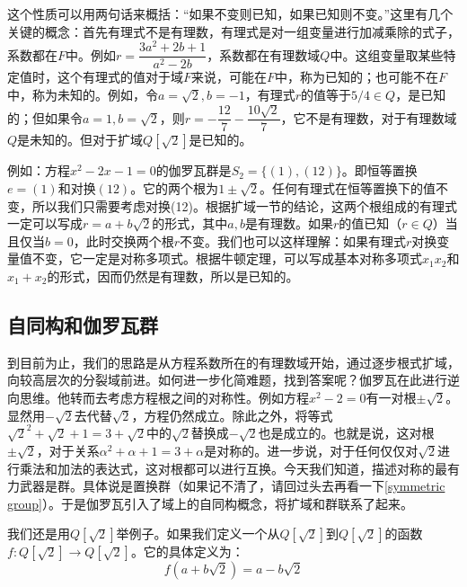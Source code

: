 \documentclass[b5paper]{ctexart}
\begin{document}
这个性质可以用两句话来概括：“如果不变则已知，如果已知则不变。”这里有几个关键的概念：首先有理式不是有理数，有理式是对一组变量进行加减乘除的式子，系数都在$F$中。例如$r = \dfrac{3a^2 + 2b + 1}{a^2 - 2b}$，系数都在有理数域$Q$中。这组变量取某些特定值时，这个有理式的值对于域$F$来说，可能在$F$中，称为已知的；也可能不在$F$中，称为未知的。例如，令$a = \sqrt{2}, b = -1$，有理式$r$的值等于$5/4 \in Q$，是已知的；但如果令$a = 1, b = \sqrt{2}$，则$r = -\dfrac{12}{7} - \dfrac{10\sqrt{2}}{7}$，它不是有理数，对于有理数域$Q$是未知的。但对于扩域$Q[\sqrt{2}]$是已知的。

例如：方程$x^2 - 2x - 1 = 0$的伽罗瓦群是$S_2 = \{(1), (12)\}$。即恒等置换$e = (1)$和对换$(12)$。它的两个根为$1 \pm \sqrt{2}$。任何有理式在恒等置换下的值不变，所以我们只需要考虑对换(12)。根据扩域一节的结论，这两个根组成的有理式一定可以写成$r = a + b\sqrt{2}$的形式，其中$a, b$是有理数。如果$r$的值已知（$r \in Q$）当且仅当$b = 0$，此时交换两个根$r$不变。我们也可以这样理解：如果有理式$r$对换变量值不变，它一定是对称多项式。根据牛顿定理，可以写成基本对称多项式$x_1x_2$和$x_1 + x_2$的形式，因而仍然是有理数，所以是已知的。



\begin{Exercise}
\end{Exercise}

\subsection{自同构和伽罗瓦群}

到目前为止，我们的思路是从方程系数所在的有理数域开始，通过逐步根式扩域，向较高层次的分裂域前进。如何进一步化简难题，找到答案呢？伽罗瓦在此进行逆向思维。他转而去考虑方程根之间的对称性。例如方程$x^2 - 2 = 0$有一对根$\pm \sqrt{2}$。显然用$-\sqrt{2}$去代替$\sqrt{2}$，方程仍然成立。除此之外，将等式$\sqrt{2}^2 + \sqrt{2} + 1 = 3 + \sqrt{2}$中的$\sqrt{2}$替换成$-\sqrt{2}$也是成立的。也就是说，这对根$\pm \sqrt{2}$，对于关系$\alpha^2 + \alpha + 1 = 3 + \alpha$是对称的。进一步说，对于任何仅仅对$\sqrt{2}$进行乘法和加法的表达式，这对根都可以进行互换。今天我们知道，描述对称的最有力武器是群。具体说是置换群（如果记不清了，请回过头去再看一下\ref{symmetric group}）。于是伽罗瓦引入了域上的自同构概念，将扩域和群联系了起来。

我们还是用$Q[\sqrt{2}]$举例子。如果我们定义一个从$Q[\sqrt{2}]$到$Q[\sqrt{2}]$的函数$f: Q[\sqrt{2}] \to Q[\sqrt{2}]$。它的具体定义为：
\[
f(a + b \sqrt{2}) = a - b \sqrt{2}
\]
\end{document}
